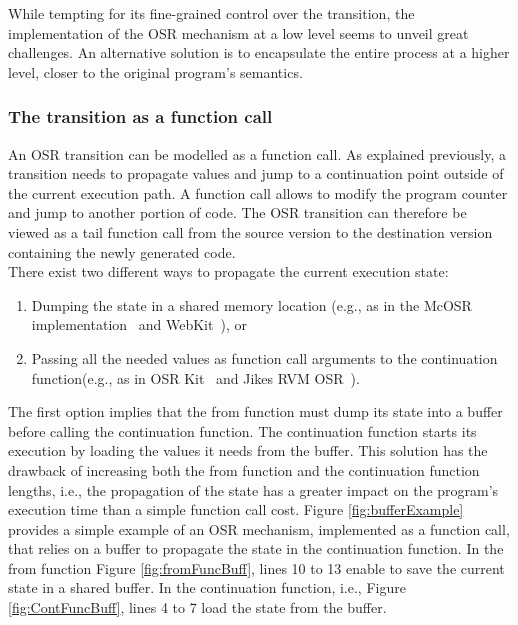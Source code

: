 While tempting for its fine-grained control over the transition, the implementation of the OSR mechanism at a low level seems to unveil great challenges.
An alternative solution is to encapsulate the entire process at a higher level, closer to the original program's semantics.\\

\subsubsection{The transition as a function call}
An OSR transition can be modelled as a function call.
As explained previously, a transition needs to propagate values and jump to a continuation point outside of the current execution path.
A function call allows to modify the program counter and jump to another portion of code.
The OSR transition can therefore be viewed as a tail function call from the source version to the destination version containing the newly generated code.\\

There exist two different ways to propagate the current execution state:
\begin{enumerate}
    \item Dumping the state in a shared memory location (e.g., as in the McOSR implementation~\cite{lameed2013modular} and WebKit~\cite{WebKitURL}), or
    \item Passing all the needed values as function call arguments to the continuation function(e.g., as in OSR Kit~\cite{OSRKit} and Jikes RVM OSR~\cite{fink2003design}).
\end{enumerate}

The first option implies that the from function must dump its state into a buffer before calling the continuation function.
The continuation function starts its execution by loading the values it needs from the buffer.
This solution has the drawback of increasing both the from function and the continuation function lengths, i.e., the propagation of the state has a greater impact on the program's execution time than a simple function call cost.
Figure \ref{fig:bufferExample} provides a simple example of an OSR mechanism, implemented as a function call, that relies on a buffer to propagate the state in the continuation function.
In the from function Figure \ref{fig:fromFuncBuff}, lines 10 to 13 enable to save the current state in a shared buffer.
In the continuation function, i.e., Figure \ref{fig:ContFuncBuff}, lines 4 to 7 load the state from the buffer.\\


